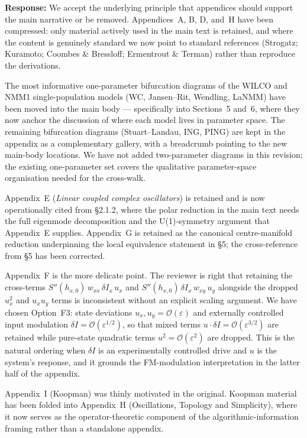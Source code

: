 \documentclass[12pt,a4paper]{article}
\newcommand{\ourresponse}[1]{\par\noindent\textbf{Response:} #1\par\medskip}
\begin{document}
\ourresponse{We accept the underlying principle that appendices should support the main narrative or be removed. Appendices~A, B, D, and~H have been compressed: only material actively used in the main text is retained, and where the content is genuinely standard we now point to standard references (Strogatz; Kuramoto; Coombes \& Bressloff; Ermentrout \& Terman) rather than reproduce the derivations.

The most informative one-parameter bifurcation diagrams of the WILCO and NMM1 single-population models (WC, Jansen--Rit, Wendling, LaNMM) have been moved into the main body --- specifically into Sections~5 and~6, where they now anchor the discussion of where each model lives in parameter space. The remaining bifurcation diagrams (Stuart--Landau, ING, PING) are kept in the appendix as a complementary gallery, with a breadcrumb pointing to the new main-body locations. We have not added two-parameter diagrams in this revision; the existing one-parameter set covers the qualitative parameter-space organisation needed for the cross-walk.

Appendix~E (\emph{Linear coupled complex oscillators}) is retained and is now operationally cited from §2.1.2, where the polar reduction in the main text needs the full eigenmode decomposition and the U(1)-symmetry argument that Appendix~E supplies. Appendix~G is retained as the canonical centre-manifold reduction underpinning the local equivalence statement in §5; the cross-reference from §5 has been corrected.

Appendix~F is the more delicate point. The reviewer is right that retaining the cross-terms $S''(h_{x,0})\,w_{xx}\,\delta I_x\,u_x$ and $S''(h_{x,0})\,\delta I_x\,w_{xy}\,u_y$ alongside the dropped $u_x^2$ and $u_x u_y$ terms is inconsistent without an explicit scaling argument. We have chosen Option~F3: state deviations $u_x,u_y=\mathcal{O}(\varepsilon)$ and externally controlled input modulation $\delta I=\mathcal{O}(\varepsilon^{1/2})$, so that mixed terms $u\cdot\delta I=\mathcal{O}(\varepsilon^{3/2})$ are retained while pure-state quadratic terms $u^2=\mathcal{O}(\varepsilon^2)$ are dropped. This is the natural ordering when $\delta I$ is an experimentally controlled drive and $u$ is the system's response, and it grounds the FM-modulation interpretation in the latter half of the appendix.

Appendix~I (Koopman) was thinly motivated in the original. %
Koopman material has been folded into Appendix~H (Oscillations, Topology and Simplicity), where it now serves as the operator-theoretic component of the algorithmic-information framing rather than a standalone appendix.

}
\end{document}

